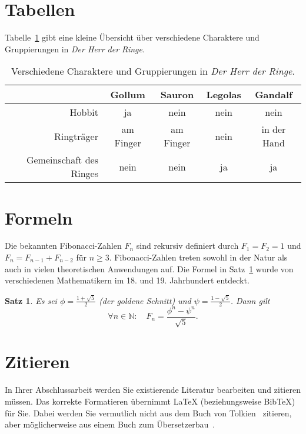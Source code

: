 \documentclass[11pt, a4paper]{article}
\newtheorem{satz}{Satz}
\begin{document}
\section{Tabellen}

Tabelle~\ref{tab:2} gibt eine kleine Übersicht über verschiedene
Charaktere und Gruppierungen in \emph{Der Herr der Ringe}.

\begin{table}[b]
	\centering
	\begin{tabular}{|r|c|c|c|c|}
		\hline 	 	 	
		& Gollum & Sauron & Legolas & Gandalf\\
		\hline\hline
		Hobbit & ja & nein & nein & nein\\
		\hline
		Ringträger & am Finger  & am Finger  & nein & in
		der Hand\\
		\hline
		Gemeinschaft des Ringes & nein & nein & ja & ja\\
		\hline
	\end{tabular}
	\caption{Verschiedene Charaktere und Gruppierungen in
	\emph{Der Herr der Ringe}.}
	\label{tab:2}
\end{table}

\section{Formeln}
\label{sec:mathe}   %

Die bekannten Fibonacci-Zahlen $F_n$ sind rekursiv definiert
durch $F_1=F_2=1$ und $F_n=F_{n-1}+F_{n-2}$ für $n\geq 3$.
Fibonacci-Zahlen treten sowohl in der Natur als auch in vielen
theoretischen Anwendungen auf. Die Formel in Satz~\ref{satz:3}
wurde von verschiedenen Mathematikern im 18. und 19. Jahrhundert
entdeckt.

\begin{satz}\label{satz:3}
 Es sei $\phi=\frac{1+\sqrt{5}}{2}$ (der goldene Schnitt) und
 $\psi=\frac{1-\sqrt{5}}{2}$. Dann gilt
 \[\forall n\in\mathbb{N}:\quad F_n = \frac{\phi^n-\psi^n}%
   {\sqrt{5}}.\]
\end{satz}

\section{Zitieren}

In Ihrer Abschlussarbeit werden Sie existierende Literatur
bearbeiten und zitieren müssen. Das korrekte Formatieren
übernimmt LaTeX (beziehungsweise BibTeX) für Sie. Dabei werden
Sie vermutlich nicht aus dem Buch von Tolkien~\cite{Tolkien54}
zitieren, aber möglicherweise aus einem Buch zum
Übersetzerbau~\cite{ALSU06}.
\end{document}
